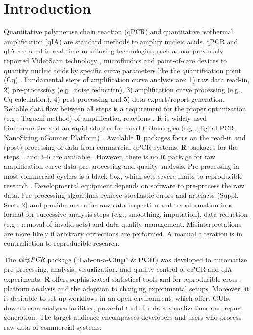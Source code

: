 \documentclass{bioinfo}
\begin{document}
\section{Introduction}

Quantitative polymerase chain reaction (qPCR) and quantitative isothermal 
amplification (qIA) are standard methods to amplify nucleic acids. qPCR and qIA 
are used in real-time monitoring technologies, such as our previously reported 
VideoScan technology \citep{roediger_highly_2013,spiess_impact_2014}, 
microfluidics and point-of-care devices to quantify nucleic acids by specific 
curve parameters like the quantification point (Cq) 
\citep{pabinger_2014,rodiger_nucleic_2014}. Fundamental steps of amplification 
curve analysis are: 1) raw data read-in, 2) pre-processing (e.g., noise 
reduction), 3) amplification curve processing (e.g., Cq calculation), 4) 
post-processing and 5) data export/report generation. Reliable data flow between 
all steps is a requirement for the proper optimization (e.g., Taguchi method) of amplification reactions 
\citep{cobb_1994}. \textbf{R} is widely used bioinformatics and an rapid adopter 
for novel technologies (e.g., digital PCR, NanoString nCounter Platform) 
\citep{waggott_2012,pabinger_2014}. Available \textbf{R} packages focus on the 
read-in and (post)-processing of data from commercial qPCR systems. \textbf{R} 
packages for the steps 1 and 3--5 are available 
\citep{perkins_2012,gehlenborg_2013,mccall_2014,pabinger_2014}. However, there 
is no \textbf{R} package for raw amplification curve data pre-processing and 
quality analysis. Pre-processing in most commercial cyclers is a black box, 
which sets severe limits to reproducible research \citep{Leeper_2014}. 
Developmental equipment depends on software to pre-process the raw data. 
Pre-processing algorithms remove stochastic errors and artefacts (Suppl. 
Sect.~2) and provide means for raw data inspection and transformation in a 
format for successive analysis steps (e.g., smoothing, imputation), data 
reduction (e.g., removal of invalid sets) and data quality 
management. Misinterpretations are more likely if 
arbitrary corrections are performed. A manual alteration is in contradiction to 
reproducible research.

The $\emph{chipPCR}$ package (``Lab-on-a-\textbf{Chip}'' \& \textbf{PCR}) was 
developed to automatize pre-processing, analysis, visualization, and quality 
control of qPCR and qIA experiments. \textbf{R} offers sophisticated statistical 
tools and for reproducible cross-platform analysis and the adoption to changing 
experimental setups. Moreover, it is desirable to set up workflows in an open 
environment, which offers GUIs, downstream analyses facilities, powerful tools 
for data visualizations and report generation. The target audience encompasses 
developers and users who process raw data of commercial systems.
\end{document}
